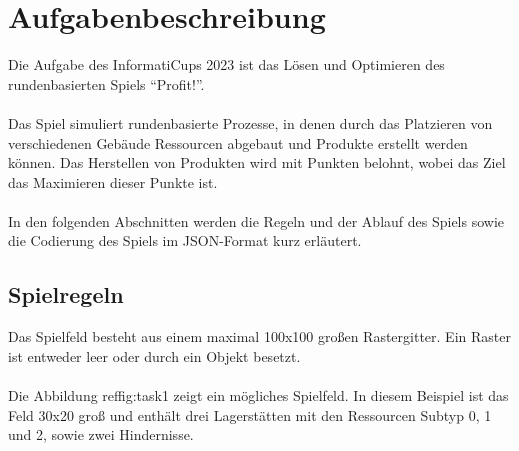 \section{Aufgabenbeschreibung}\label{cap:aufgabenbeschriebung}
Die Aufgabe des InformatiCups 2023 ist das Lösen und Optimieren des rundenbasierten Spiels “Profit!”. 
\\\\
Das Spiel simuliert rundenbasierte Prozesse, in denen durch das Platzieren von verschiedenen Gebäude Ressourcen abgebaut und Produkte erstellt werden können. Das Herstellen von Produkten wird mit Punkten belohnt, wobei das Ziel das Maximieren dieser Punkte ist.
\\\\
In den folgenden Abschnitten werden die Regeln und der Ablauf des Spiels sowie die Codierung des Spiels im JSON-Format kurz erläutert.

\subsection{Spielregeln}\label{cap:spielregeln}
Das Spielfeld besteht aus einem maximal 100x100 großen Rastergitter. Ein Raster ist entweder leer oder durch ein Objekt besetzt.
\\\\
Die Abbildung ref{fig:task1} zeigt ein mögliches Spielfeld. In diesem Beispiel ist das Feld 30x20 groß und enthält drei Lagerstätten mit den Ressourcen Subtyp 0, 1 und 2, sowie zwei Hindernisse.

